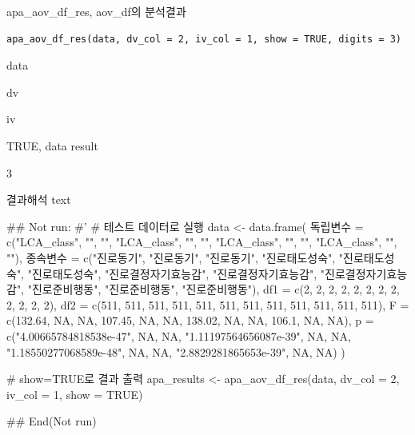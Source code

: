 \documentclass[a4paper]{book}
\begin{document}
%
\begin{Description}
apa\_aov\_df\_res, aov\_df의 분석결과
\end{Description}
%
\begin{Usage}
\begin{verbatim}
apa_aov_df_res(data, dv_col = 2, iv_col = 1, show = TRUE, digits = 3)
\end{verbatim}
\end{Usage}
%
\begin{Arguments}
\begin{ldescription}
\item[\code{data}] data

\item[\code{dv\_col}] dv

\item[\code{iv\_col}] iv

\item[\code{show}] TRUE, data result

\item[\code{digits}] 3
\end{ldescription}
\end{Arguments}
%
\begin{Value}
결과해석 text
\end{Value}
%
\begin{Examples}
\begin{ExampleCode}
\#\# Not run: 
#'
# 테스트 데이터로 실행
data <- data.frame(
  독립변수 = c("LCA_class", "", "", "LCA_class",
  "", "", "LCA_class", "", "", "LCA_class", "", ""),
  종속변수 = c("진로동기", "진로동기", "진로동기",
  "진로태도성숙", "진로태도성숙", "진로태도성숙",
  "진로결정자기효능감", "진로결정자기효능감", "진로결정자기효능감",
  "진로준비행동", "진로준비행동", "진로준비행동"),
  df1 = c(2, 2, 2, 2, 2, 2, 2, 2, 2, 2, 2, 2),
  df2 = c(511, 511, 511, 511, 511, 511,
   511, 511, 511, 511, 511, 511),
  F = c(132.64, NA, NA, 107.45, NA, NA,
   138.02, NA, NA, 106.1, NA, NA),
  p = c("4.00665784818538e-47", NA, NA,
   "1.11197564656087e-39", NA, NA,
   "1.18550277068589e-48", NA, NA,
   "2.8829281865653e-39", NA, NA)
)

# show=TRUE로 결과 출력
apa_results <- apa_aov_df_res(data, dv_col = 2, iv_col = 1, show = TRUE)


## End(Not run)
\end{ExampleCode}
\end{Examples}
\end{document}
